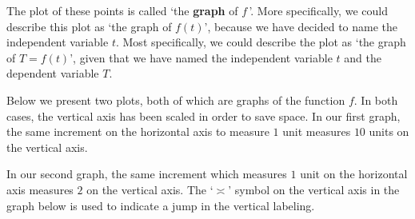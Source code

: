 \documentclass{ximera}
\begin{document}
 

The plot of these points is called `the \textbf{graph} of $f\,$'.  More specifically, we could describe this plot as `the graph of $f(t)$', because we have decided to name the independent variable $t$.  Most specifically, we could describe the plot as `the graph of $T = f(t)$', given that we have named the independent variable $t$ and the dependent variable $T$.  

Below we present two plots, both of which are graphs of the function $f$.  In both cases, the vertical axis has been scaled in order to save space.  In our first graph, the same increment on the horizontal axis to measure $1$ unit measures $10$ units on the vertical axis. 


\begin{image}
\end{image}
\begin{center}
\end{center}

In our second graph, the same increment which measures $1$ unit on the horizontal axis measures $2$ on the vertical axis.  The `$\asymp$' symbol on the vertical axis in the graph below is used to indicate a jump in the vertical labeling.  
\end{document}
